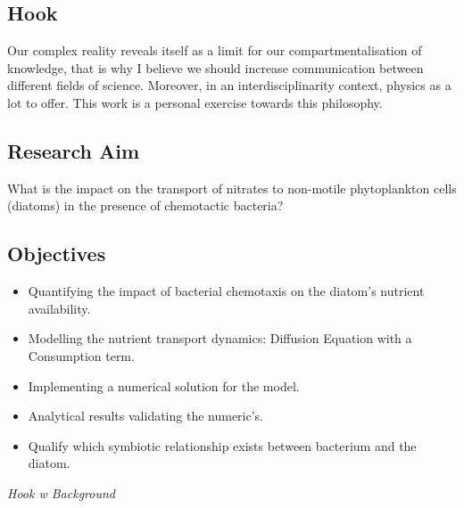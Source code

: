\subsection*{Hook}


{\color{red}
Our complex reality reveals itself as a limit for our compartmentalisation of knowledge,
that is why I believe we should increase communication between different fields of science.
Moreover, in an interdisciplinarity context, physics as a lot to offer.
This work is a personal exercise towards this philosophy. 
}
\subsection*{Research Aim}

What is the impact on the transport of nitrates to non-motile phytoplankton cells (diatoms) in
the presence of chemotactic bacteria?

\subsection*{Objectives}

\begin{itemize}
    \item Quantifying the impact of bacterial chemotaxis on the diatom's nutrient availability.
    \item Modelling the nutrient transport dynamics: Diffusion Equation with a Consumption term.
    \item Implementing a numerical solution for the model.
    \item Analytical results validating the numeric's.
    \item \color{red} Qualify which symbiotic relationship exists between bacterium and the diatom.  
\end{itemize}




\vspace{1cm}

\textit{Hook w Background}
